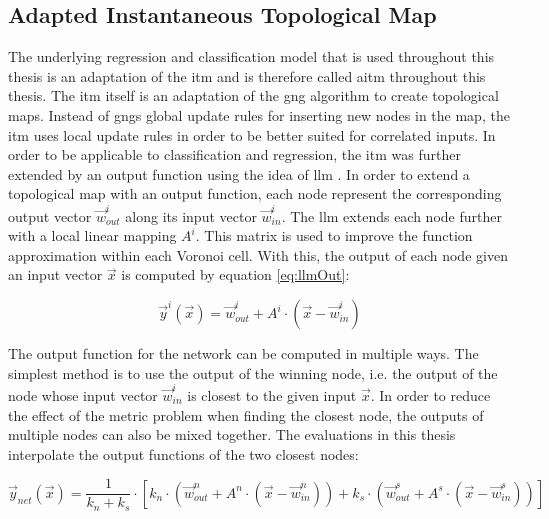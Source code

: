 \subsection{Adapted Instantaneous Topological Map \label{sec:ITM}}

The underlying regression and classification model that is used throughout this thesis is an adaptation of the \acrfull{itm} and is therefore called \acrfull{aitm} throughout this thesis.
The \gls{itm} \cite{itm} itself is an adaptation of the \gls{gng} \cite{gng} algorithm to create topological maps. Instead of \glspl{gng} global update rules for inserting new nodes in the map, the \gls{itm} uses local update rules in order to be better suited for correlated inputs. 
In order to be applicable to classification and regression, the \gls{itm} was further extended by an output function using the idea of \gls{llm} \cite{LLM}. In order to extend a topological map with an output function, each node represent the corresponding output vector $\vec{w}^i_{out}$ along its input vector $\vec{w}^i_{in}$. The \gls{llm} extends each node further with a local linear mapping $A^i$. This matrix is used to improve the function approximation within each Voronoi cell. With this, the output of each node given an input vector $\vec{x}$ is computed by equation \ref{eq:llmOut}:

\begin{equation}
\vec{y}^i(\vec{x}) = \vec{w}^i_{out} + A^i \cdot (\vec{x}-\vec{w}^i_{in})
\label{eq:llmOut}
\end{equation}

The output function for the network can be computed in multiple ways. The simplest method is to use the output of the winning node, i.e. the output of the node whose input vector $\vec{w}^i_{in}$ is closest to the given input $\vec{x}$. In order to reduce the effect of the metric problem when finding the closest node, the outputs of multiple nodes can also be mixed together. %
The evaluations in this thesis interpolate the output functions of the two closest nodes:

\begin{equation}
\vec{y}_{net}(\vec{x}) =  \frac{1}{k_n+k_s} \cdot \left[ k_n \cdot \left(\vec{w}^n_{out} + A^n \cdot \left(\vec{x}-\vec{w}^n_{in}\right)\right) + k_s \cdot  \left(\vec{w}^s_{out} + A^s \cdot \left(\vec{x}-\vec{w}^s_{in}\right)\right)\right]
\end{equation}

